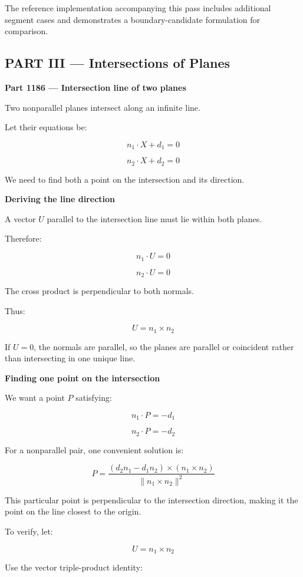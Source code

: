 The reference implementation accompanying this pass includes additional segment cases and demonstrates a boundary-candidate formulation for comparison.

\subsection{PART III --- Intersections of Planes}\label{04-visual-computing-ii-ch022-part-iii-intersections-of-planes}

\textbf{Part 1186 --- Intersection line of two planes}

Two nonparallel planes intersect along an infinite line.

Let their equations be:

\[
n_1\cdot X+d_1=0
\]

\[
n_2\cdot X+d_2=0
\]

We need to find both a point on the intersection and its direction.

\textbf{Deriving the line direction}

A vector \(U\) parallel to the intersection line must lie within both planes.

Therefore:

\[
n_1\cdot U=0
\]

\[
n_2\cdot U=0
\]

The cross product is perpendicular to both normals.

Thus:

\[
\boxed{ U=n_1\times n_2 }
\]

If \(U=0\), the normals are parallel, so the planes are parallel or coincident rather than intersecting in one unique line.

\textbf{Finding one point on the intersection}

We want a point \(P\) satisfying:

\[
n_1\cdot P=-d_1
\]

\[
n_2\cdot P=-d_2
\]

For a nonparallel pair, one convenient solution is:

\[
\boxed{ P= \frac{ (d_2n_1-d_1n_2)\times(n_1\times n_2) }{ \|n_1\times n_2\|^2 } }
\]

This particular point is perpendicular to the intersection direction, making it the point on the line closest to the origin.

To verify, let:

\[
U=n_1\times n_2
\]

Use the vector triple-product identity:

